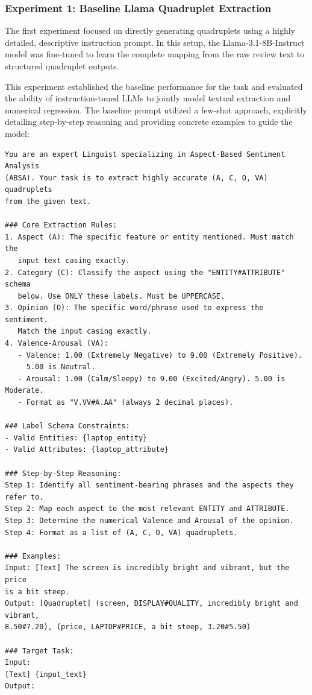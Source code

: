 \documentclass{article}
\begin{document}
\subsubsection{Experiment 1: Baseline Llama Quadruplet Extraction}

The first experiment focused on directly generating quadruplets using a highly detailed, descriptive instruction prompt. In this setup, the Llama-3.1-8B-Instruct model was fine-tuned to learn the complete mapping from the raw review text to structured quadruplet outputs.

This experiment established the baseline performance for the task and evaluated the ability of instruction-tuned LLMs to jointly model textual extraction and numerical regression. The baseline prompt utilized a few-shot approach, explicitly detailing step-by-step reasoning and providing concrete examples to guide the model:

\begin{verbatim}
You are an expert Linguist specializing in Aspect-Based Sentiment Analysis 
(ABSA). Your task is to extract highly accurate (A, C, O, VA) quadruplets 
from the given text.

### Core Extraction Rules:
1. Aspect (A): The specific feature or entity mentioned. Must match the 
   input text casing exactly.
2. Category (C): Classify the aspect using the "ENTITY#ATTRIBUTE" schema 
   below. Use ONLY these labels. Must be UPPERCASE.
3. Opinion (O): The specific word/phrase used to express the sentiment. 
   Match the input casing exactly.
4. Valence-Arousal (VA): 
   - Valence: 1.00 (Extremely Negative) to 9.00 (Extremely Positive). 
     5.00 is Neutral.
   - Arousal: 1.00 (Calm/Sleepy) to 9.00 (Excited/Angry). 5.00 is Moderate.
   - Format as "V.VV#A.AA" (always 2 decimal places).

### Label Schema Constraints:
- Valid Entities: {laptop_entity}
- Valid Attributes: {laptop_attribute}

### Step-by-Step Reasoning:
Step 1: Identify all sentiment-bearing phrases and the aspects they refer to.
Step 2: Map each aspect to the most relevant ENTITY and ATTRIBUTE.
Step 3: Determine the numerical Valence and Arousal of the opinion.
Step 4: Format as a list of (A, C, O, VA) quadruplets.

### Examples:
Input: [Text] The screen is incredibly bright and vibrant, but the price 
is a bit steep.
Output: [Quadruplet] (screen, DISPLAY#QUALITY, incredibly bright and vibrant, 
8.50#7.20), (price, LAPTOP#PRICE, a bit steep, 3.20#5.50)

### Target Task:
Input:
[Text] {input_text}
Output:
\end{verbatim}
\end{document}
